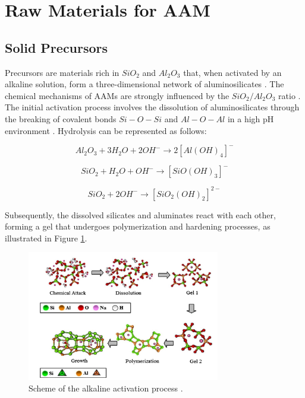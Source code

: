 \section{Raw Materials for AAM}

\subsection{Solid Precursors}

Precursors are materials rich in $SiO_2$ and $Al_2O_3$ that, when activated by an alkaline solution, form a three-dimensional network of aluminosilicates \cite{rakhimova2019metakaolin}.
The chemical mechanisms of AAMs are strongly influenced by the $SiO_2/Al_2O_3$ ratio \cite{provis2007geopolymerisation}.
The initial activation process involves the dissolution of aluminosilicates through the breaking of covalent bonds $Si-O-Si$ and $Al-O-Al$ in a high pH environment \cite{Severo2013}. Hydrolysis can be represented as follows:

\begin{equation}
  Al_2O_3 + 3H_2O + 2OH^- \rightarrow 2\left[Al(OH)_4\right]^- 
\end{equation}

\begin{equation}
  SiO_2 + H_2O + OH^- \rightarrow \left[SiO(OH)_3\right]^- 
\end{equation}

\begin{equation}
  SiO_2 + 2OH^- \rightarrow \left[SiO_2(OH)_2\right]^{2-}
\end{equation}

Subsequently, the dissolved silicates and aluminates react with each other, forming a gel that undergoes polymerization and hardening processes, as illustrated in Figure \ref{fig:activation}.

\begin{figure}[ht]
  \centering
  \includegraphics[width=0.75\textwidth]{Cap2/images/activation.png}
  \caption{Scheme of the alkaline activation process \cite{duxson2006geopolymer}.}
  \label{fig:activation}
\end{figure}

